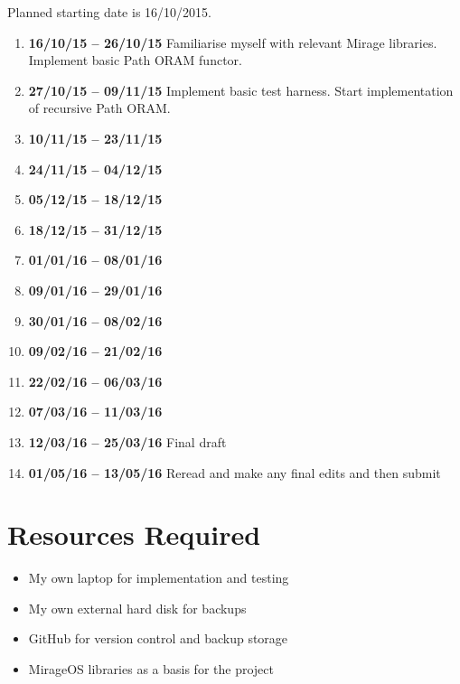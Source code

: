 \documentclass[12pt,a4paper,twoside]{article}
\begin{document}
Planned starting date is 16/10/2015.

\begin{enumerate}

\item {\bf 16/10/15 -- 26/10/15} Familiarise myself with relevant Mirage libraries. Implement basic Path ORAM functor.

\item {\bf 27/10/15 -- 09/11/15} Implement basic test harness. Start implementation of recursive Path ORAM.

\item {\bf 10/11/15 -- 23/11/15} 

\item {\bf 24/11/15 -- 04/12/15} 

\item {\bf 05/12/15 -- 18/12/15} 

\item {\bf 18/12/15 -- 31/12/15} 

\item {\bf 01/01/16 -- 08/01/16} 

\item {\bf 09/01/16 -- 29/01/16}

\item {\bf 30/01/16 -- 08/02/16} 

\item {\bf 09/02/16 -- 21/02/16} 

\item {\bf 22/02/16 -- 06/03/16} 

\item {\bf 07/03/16 -- 11/03/16} 

\item {\bf 12/03/16 -- 25/03/16} Final draft

\item {\bf 01/05/16 -- 13/05/16} Reread and make any final edits and then submit

\end{enumerate}

\section*{Resources Required}

\begin{itemize}

	\item My own laptop for implementation and testing

	\item My own external hard disk for backups

	\item GitHub for version control and backup storage

	\item MirageOS libraries as a basis for the project

\end{itemize}
\end{document}
